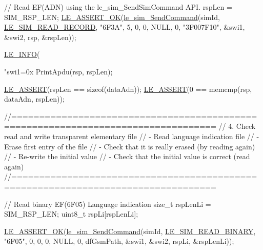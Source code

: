 \begin{DoxyCodeInclude}
{{    \textcolor{comment}{// Read EF(ADN) using the le\_sim\_SendSimCommand API.}
    rspLen = SIM\_RSP\_LEN;
    \hyperlink{le__log_8h_a7cd2daa3d4af1de4d29e0eed95187484}{LE\_ASSERT\_OK}(\hyperlink{le__sim__interface_8h_a8bbaea044b44f8b0ebff67bf98de816a}{le\_sim\_SendCommand}(simId,
                                    \hyperlink{le__sim__interface_8h_ac1a708ba305c36e33383073ec7f0e331aa2d4ea6bc380cab183fb215911a39f14}{LE\_SIM\_READ\_RECORD},
                                    \textcolor{stringliteral}{"6F3A"},
                                    5,
                                    0,
                                    0,
                                    NULL,
                                    0,
                                    \textcolor{stringliteral}{"3F007F10"},
                                    &swi1,
                                    &swi2,
                                    rsp,
                                    &rspLen));

    \hyperlink{le__log_8h_a23e6d206faa64f612045d688cdde5808}{LE\_INFO}(\textcolor{stringliteral}{"swi1=0x%
    PrintApdu(rsp, rspLen);

    \hyperlink{le__log_8h_ac0dbbef91dc0fed449d0092ff0557b39}{LE\_ASSERT}(rspLen == \textcolor{keyword}{sizeof}(dataAdn));
    \hyperlink{le__log_8h_ac0dbbef91dc0fed449d0092ff0557b39}{LE\_ASSERT}(0 == memcmp(rsp, dataAdn, rspLen));

    \textcolor{comment}{//==================================================================================}
    \textcolor{comment}{// 4. Check read and write transparent elementary file}
    \textcolor{comment}{// - Read language indication file}
    \textcolor{comment}{// - Erase first entry of the file}
    \textcolor{comment}{// - Check that it is really erased (by reading again)}
    \textcolor{comment}{// - Re-write the initial value}
    \textcolor{comment}{// - Check that the initial value is correct (read again)}
    \textcolor{comment}{//==================================================================================}

    \textcolor{comment}{// Read binary EF(6F05) Language indication}
    \textcolor{keywordtype}{size\_t} rspLenLi = SIM\_RSP\_LEN;
    uint8\_t rspLi[rspLenLi];

    \hyperlink{le__log_8h_a7cd2daa3d4af1de4d29e0eed95187484}{LE\_ASSERT\_OK}(\hyperlink{le__sim__interface_8h_a8bbaea044b44f8b0ebff67bf98de816a}{le\_sim\_SendCommand}(simId,
                                    \hyperlink{le__sim__interface_8h_ac1a708ba305c36e33383073ec7f0e331ae4a619ba58f2cd503103b397b717b16f}{LE\_SIM\_READ\_BINARY},
                                    \textcolor{stringliteral}{"6F05"},
                                    0,
                                    0,
                                    0,
                                    NULL,
                                    0,
                                    dfGsmPath,
                                    &swi1,
                                    &swi2,
                                    rspLi,
                                    &rspLenLi));

}}}
\end{DoxyCodeInclude}
